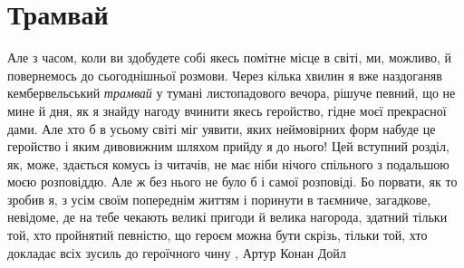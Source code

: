  
 
 
 
 
\chapter{Трамвай}
\label{sec:slova.tramvaj}

Але з часом, коли ви здобудете собі якесь помітне місце в світі, ми, можливо, й
повернемось до сьогоднішньої розмови.  Через кілька хвилин я вже наздоганяв
кембервельський \emph{трамвай} у тумані листопадового вечора, рішуче певний, що не
мине й дня, як я знайду нагоду вчинити якесь геройство, гідне моєї прекрасної
дами. Але хто б в усьому світі міг уявити, яких неймовірних форм набуде це
геройство і яким дивовижним шляхом прийду я до нього!  Цей вступний розділ, як,
може, здається комусь із читачів, не має ніби нічого спільного з подальшою моєю
розповіддю. Але ж без нього не було б і самої розповіді. Бо порвати, як то
зробив я, з усім своїм попереднім життям і поринути в таємниче, загадкове,
невідоме, де на тебе чекають великі пригоди й велика нагорода, здатний тільки
той, хто пройнятий певністю, що героєм можна бути скрізь, тільки той, хто
докладає всіх зусиль до героїчного чину
, Артур Конан Дойл
